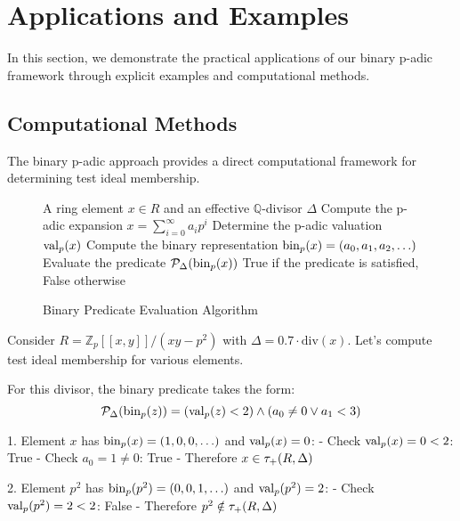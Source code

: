 \section{Applications and Examples}\label{sec:applications}

In this section, we demonstrate the practical applications of our binary p-adic framework through explicit examples and computational methods.

\subsection{Computational Methods}

The binary p-adic approach provides a direct computational framework for determining test ideal membership.

\begin{figure}[ht]
\begin{center}
\begin{minipage}{0.9\textwidth}
\begin{algorithm}[H]
\caption{Binary Predicate Evaluation Algorithm}
\label{alg:binary-predicate}
\begin{algorithmic}[1]
\Require A ring element $x \in R$ and an effective $\mathbb{Q}$-divisor $\Delta$
\State Compute the p-adic expansion $x = \sum_{i=0}^{\infty} a_i p^i$
\State Determine the p-adic valuation $\operatorname{val}_p(x)$
\State Compute the binary representation $\operatorname{bin}_p(x) = (a_0, a_1, a_2, \ldots)$
\State Evaluate the predicate $\mathcal{P}_\Delta(\operatorname{bin}_p(x))$
\State \Return True if the predicate is satisfied, False otherwise
\end{algorithmic}
\end{algorithm}
\end{minipage}
\end{center}
\end{figure}

\begin{example}\label{ex:computing-membership}
Consider $R = \mathbb{Z}_p[[x,y]]/(xy-p^2)$ with $\Delta = 0.7 \cdot \text{div}(x)$. Let's compute test ideal membership for various elements.

For this divisor, the binary predicate takes the form:
$$\mathcal{P}_\Delta(\operatorname{bin}_p(z)) = (\operatorname{val}_p(z) < 2) \wedge (a_0 \neq 0 \vee a_1 < 3)$$

1. Element $x$ has $\operatorname{bin}_p(x) = (1,0,0,\ldots)$ and $\operatorname{val}_p(x) = 0$:
   - Check $\operatorname{val}_p(x) = 0 < 2$: True
   - Check $a_0 = 1 \neq 0$: True
   - Therefore $x \in \tau_+(R,\Delta)$

2. Element $p^2$ has $\operatorname{bin}_p(p^2) = (0,0,1,\ldots)$ and $\operatorname{val}_p(p^2) = 2$:
   - Check $\operatorname{val}_p(p^2) = 2 < 2$: False
   - Therefore $p^2 \notin \tau_+(R,\Delta)$
\end{example}

